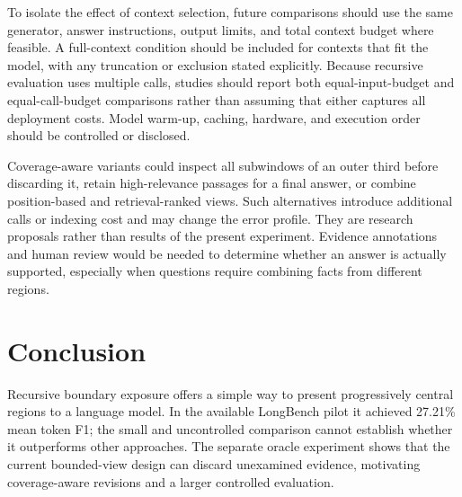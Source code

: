 \documentclass[conference]{IEEEtran}
\begin{document}
To isolate the effect of context selection, future comparisons should use the same generator, answer instructions, output limits, and total context budget where feasible. A full-context condition should be included for contexts that fit the model, with any truncation or exclusion stated explicitly. Because recursive evaluation uses multiple calls, studies should report both equal-input-budget and equal-call-budget comparisons rather than assuming that either captures all deployment costs. Model warm-up, caching, hardware, and execution order should be controlled or disclosed.

Coverage-aware variants could inspect all subwindows of an outer third before discarding it, retain high-relevance passages for a final answer, or combine position-based and retrieval-ranked views. Such alternatives introduce additional calls or indexing cost and may change the error profile. They are research proposals rather than results of the present experiment. Evidence annotations and human review would be needed to determine whether an answer is actually supported, especially when questions require combining facts from different regions.

\section{Conclusion}
Recursive boundary exposure offers a simple way to present progressively central regions to a language model. In the available LongBench pilot it achieved 27.21\% mean token F1; the small and uncontrolled comparison cannot establish whether it outperforms other approaches. The separate oracle experiment shows that the current bounded-view design can discard unexamined evidence, motivating coverage-aware revisions and a larger controlled evaluation.
\end{document}

